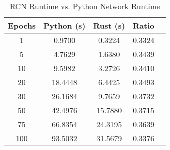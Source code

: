 \begin{table}[!htb]
    \caption{RCN Runtime vs. Python Network Runtime}
    \label{tab:rcnvpy1}
    \begin{minipage}{\linewidth}
      \centering
        \begin{tabular}{|c|c|c|c|c|}
            \hline
            Epochs & Python (s) & Rust (s) & Ratio \\
            \hline\hline
            1 & 0.9700 & 0.3224 & 0.3324 \\
            5 & 4.7629 & 1.6380 & 0.3439 \\
            10 & 9.5982 & 3.2726 & 0.3410 \\
            20 & 18.4448 & 6.4425 & 0.3493 \\
            30 & 26.1684 & 9.7659 & 0.3732 \\
            50 & 42.4976 & 15.7880 & 0.3715 \\
            75 & 66.8354 & 24.3195 & 0.3639 \\
            100 & 93.5032 & 31.5679 & 0.3376 \\
            \hline
        \end{tabular}
    \end{minipage}
\end{table}


